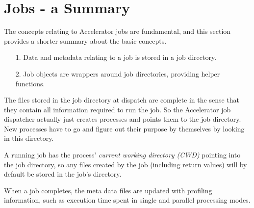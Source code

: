 \section{Jobs - a Summary}
The concepts relating to Accelerator jobs are fundamental, and this
section provides a shorter summary about the basic concepts.

\begin{itemize}
\item[1.]  Data and metadata relating to a job is stored in a
job directory.
\item[2.]  Job objects are wrappers around job directories, providing helper functions.
\end{itemize}
The files stored in the job directory at dispatch are complete in the
sense that they contain all information required to run the job.  So
the Accelerator job dispatcher actually just creates processes and
points them to the job directory.  New processes have to go and figure
out their purpose by themselves by looking in this directory.

A running job has the process' \textsl{current working directory
(CWD)} pointing into the job directory, so any files created by the
job (including return values) will by default be stored in the job's
directory.

When a job completes, the meta data files are updated with profiling
information, such as execution time spent in single and parallel
processing modes.

